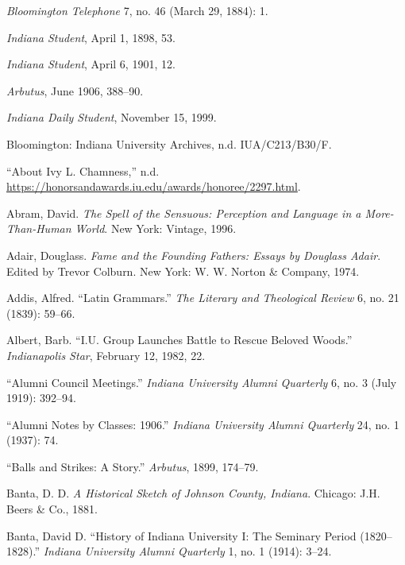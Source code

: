 \documentclass[
  american,
  letterpaper,
]{scrreprt}
\newlength{\cslhangindent}
\newenvironment{CSLReferences}[2] %
 {\begin{list}{}{%
  \setlength{\itemindent}{0pt}
  \setlength{\leftmargin}{0pt}
  \setlength{\parsep}{0pt}
  \ifodd #1
   \setlength{\leftmargin}{\cslhangindent}
   \setlength{\itemindent}{-1\cslhangindent}
  \fi
  \setlength{\itemsep}{#2\baselineskip}}}
 {\end{list}}
\begin{document}
\protect{}\label{refs}
\begin{CSLReferences}{1}{0}
\emph{Bloomington Telephone} 7, no. 46 (March 29, 1884): 1.

\emph{Indiana Student}, April 1, 1898, 53.

\emph{Indiana Student}, April 6, 1901, 12.

\emph{Arbutus}, June 1906, 388--90.

\emph{Indiana Daily Student}, November 15, 1999.

Bloomington: Indiana University Archives, n.d. IUA/C213/B30/F.

{``{About Ivy L. Chamness},''} n.d.
\url{https://honorsandawards.iu.edu/awards/honoree/2297.html}.

Abram, David. \emph{The Spell of the Sensuous: Perception and Language
in a More-Than-Human World}. New York: Vintage, 1996.

Adair, Douglass. \emph{Fame and the Founding Fathers: Essays by Douglass
Adair}. Edited by Trevor Colburn. New York: W. W. Norton \& Company,
1974.

Addis, Alfred. {``Latin Grammars.''} \emph{The Literary and Theological
Review} 6, no. 21 (1839): 59--66.

Albert, Barb. {``{I.U.} Group Launches Battle to Rescue Beloved
Woods.''} \emph{Indianapolis Star}, February 12, 1982, 22.

{``Alumni Council Meetings.''} \emph{Indiana University Alumni
Quarterly} 6, no. 3 (July 1919): 392--94.

{``Alumni Notes by Classes: 1906.''} \emph{Indiana University Alumni
Quarterly} 24, no. 1 (1937): 74.

{``Balls and Strikes: A Story.''} \emph{Arbutus}, 1899, 174--79.

Banta, D. D. \emph{A Historical Sketch of Johnson County, Indiana}.
Chicago: J.H. Beers \& Co., 1881.

Banta, David D. {``History of Indiana University {I}: The Seminary
Period (1820--1828).''} \emph{Indiana University Alumni Quarterly} 1,
no. 1 (1914): 3--24.


\end{CSLReferences}
\end{document}
